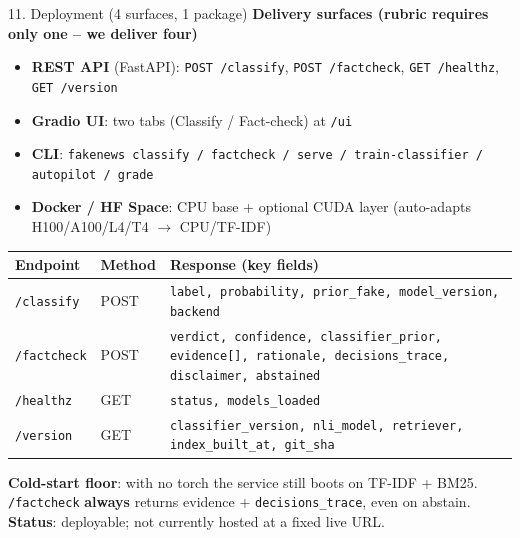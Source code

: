 \documentclass[10pt,aspectratio=169]{beamer}
\begin{document}
\begin{frame}{11. Deployment (4 surfaces, 1 package)}
\textbf{Delivery surfaces (rubric requires only one -- we deliver four)}
\begin{itemize}\small
  \item \textbf{REST API} (FastAPI): \texttt{POST /classify}, \texttt{POST /factcheck}, \texttt{GET /healthz}, \texttt{GET /version}
  \item \textbf{Gradio UI}: two tabs (Classify / Fact-check) at \texttt{/ui}
  \item \textbf{CLI}: \texttt{fakenews classify / factcheck / serve / train-classifier / autopilot / grade}
  \item \textbf{Docker / HF Space}: CPU base + optional CUDA layer (auto-adapts H100/A100/L4/T4 $\rightarrow$ CPU/TF-IDF)
\end{itemize}

\begin{table}[h]
\centering\scriptsize
\begin{tabular}{lll}
\toprule
\textbf{Endpoint} & \textbf{Method} & \textbf{Response (key fields)} \\
\midrule
\texttt{/classify} & POST & \texttt{label, probability, prior\_fake, model\_version, backend} \\
\texttt{/factcheck} & POST & \texttt{verdict, confidence, classifier\_prior, evidence[], rationale, decisions\_trace, disclaimer, abstained} \\
\texttt{/healthz} & GET & \texttt{status, models\_loaded} \\
\texttt{/version} & GET & \texttt{classifier\_version, nli\_model, retriever, index\_built\_at, git\_sha} \\
\bottomrule
\end{tabular}
\end{table}

\small \textbf{Cold-start floor}: with no torch the service still boots on TF-IDF + BM25. \texttt{/factcheck} \textbf{always} returns evidence + \texttt{decisions\_trace}, even on abstain. \textbf{Status}: deployable; not currently hosted at a fixed live URL.
\end{frame}
\end{document}
